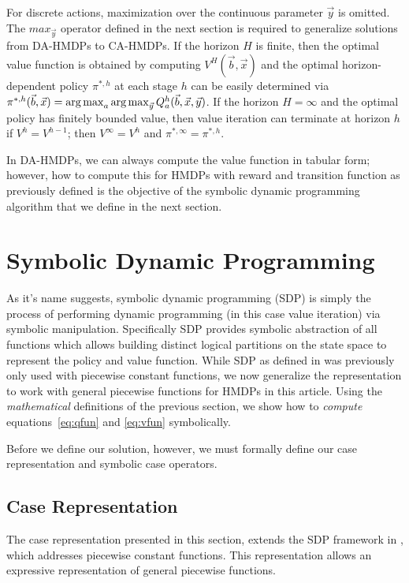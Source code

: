 \documentclass[twoside,11pt]{article}
\def\argmax{\operatornamewithlimits{arg\max}}
\begin{document}
For discrete actions, maximization over the continuous parameter $\vec{y}$ is omitted. The $max_{\vec{y}}$ operator defined in the next section is required to generalize solutions from DA-HMDPs to CA-HMDPs.
If the horizon $H$ is finite, then the optimal value function is
obtained by computing $V^H(\vec{b},\vec{x})$ and the optimal
horizon-dependent policy $\pi^{*,h}$ at each stage $h$ can be easily
determined via $\pi^{*,h}(\vec{b},\vec{x}) = \argmax_a
\argmax_{\vec{y}} Q^h_a(\vec{b},\vec{x},\vec{y})$.  If the horizon $H
= \infty$ and the optimal policy has finitely bounded value, then
value iteration can terminate at horizon $h$ if $V^{h} = V^{h-1}$;
then $V^\infty = V^h$ and $\pi^{*,\infty} = \pi^{*,h}$.

In DA-HMDPs, we can always compute the value function in tabular form;
however, how to compute this for HMDPs with reward and transition
function as previously defined is the objective of the symbolic
dynamic programming algorithm that we define in the next section.

\section{Symbolic Dynamic Programming} \label{SDP}
As it's name suggests, symbolic dynamic programming (SDP) \cite{fomdp}
is simply the process of performing dynamic programming (in this case
value iteration) via symbolic manipulation. Specifically SDP provides symbolic abstraction of all functions which allows building distinct logical partitions on the state space to represent the policy and value function. While SDP as defined
in \cite{fomdp} was previously only used with piecewise
constant functions, we now generalize the representation to work with
general piecewise functions for HMDPs in this article. Using the \emph{mathematical} definitions of the previous section, we  
show how to \emph{compute} equations~\eqref{eq:qfun} and \eqref{eq:vfun} 
symbolically.

Before we define our solution, however, we must formally define our
case representation and symbolic case operators.

\subsection{Case Representation}
\label{sec:caserep}
The case representation presented in this section, extends the SDP framework in \cite{fomdp}, which addresses piecewise constant functions. This representation allows an expressive representation of general piecewise functions.
\end{document}
